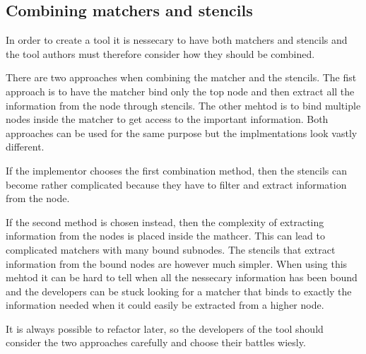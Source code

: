 \subsection{Combining matchers and stencils}

In order to create a tool it is nessecary to have both matchers and stencils and the tool authors must therefore consider how they should be combined.

There are two approaches when combining the matcher and the stencils. The fist approach is to have the matcher bind only the top node and then extract all the information from the node through stencils. The other mehtod is to bind multiple nodes inside the matcher to get access to the important information. Both approaches can be used for the same purpose but the implmentations look vastly different.
 
If the implementor chooses the first combination method, then the stencils can become rather complicated because they have to filter and extract information from the node. 

If the second method is chosen instead, then the complexity of extracting information from the nodes is placed inside the mathcer. This can lead to complicated matchers with many bound subnodes. The stencils that extract information from the bound nodes are however much simpler. When using this mehtod it can be hard to tell when all the nessecary information has been bound and the developers can be stuck looking for a matcher that binds to exactly the information needed when it could easily be extracted from a higher node.

It is always possible to refactor later, so the developers of the tool should consider the two approaches carefully and choose their battles wiesly.